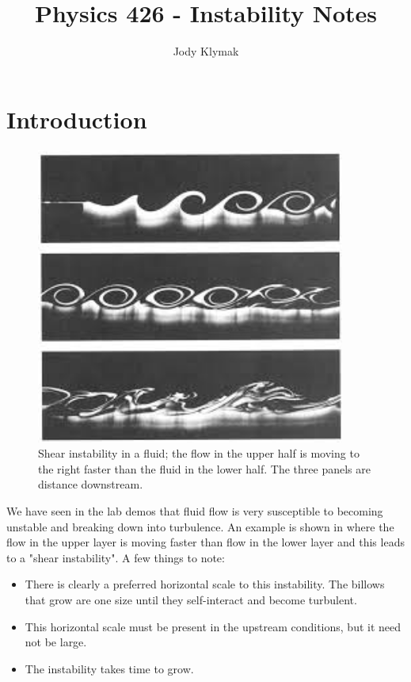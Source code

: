 \documentclass[11pt]{article}
\title{Physics 426 - Instability Notes}
\author{Jody Klymak}
\begin{document}
\maketitle
\pagestyle{fancy}
\section{Introduction}

\begin{figure}[hbtp]
  \begin{center}
    \includegraphics[width=4in]{images/Instability.jpg}
    \caption{Shear instability in a fluid; the flow in the upper half is moving to the right faster than the fluid in the lower half.   The three panels are distance downstream.}
    \label{fig:Instability}
  \end{center}
\end{figure}

We have seen in the lab demos that fluid flow is very susceptible to becoming unstable and breaking down into turbulence.  An example is shown in  where the flow in the upper layer is moving faster than flow in the lower layer and this leads to a "shear instability".  A few things to note:

\begin{itemize}
  \item There is clearly a preferred horizontal scale to this instability.  The billows that grow are one size until they self-interact and become turbulent.
  \item This horizontal scale must be present in the upstream conditions, but it need not be large.  
  \item The instability takes time to grow. 
\end{itemize}
\end{document}
